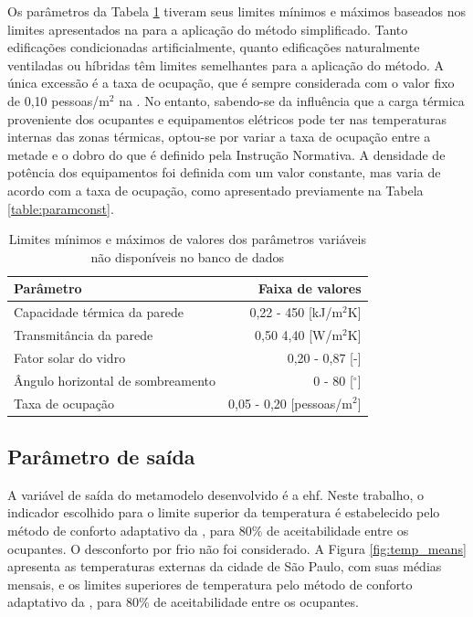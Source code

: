 \documentclass[brazil,hardcopy,openany]{ufscthesis} %
\begin{document}
Os parâmetros da Tabela \ref{table:paraminic} tiveram seus limites mínimos e máximos baseados nos limites apresentados na  para a aplicação do método simplificado. Tanto edificações condicionadas artificialmente, quanto edificações naturalmente ventiladas ou híbridas têm limites semelhantes para a aplicação do método.
A única excessão é a taxa de ocupação, que é sempre considerada com o valor fixo de 0,10 pessoas/m$^2$ na . No entanto, sabendo-se da influência que a carga térmica proveniente dos ocupantes e equipamentos elétricos pode ter nas temperaturas internas das zonas térmicas, optou-se por variar a taxa de ocupação entre a metade e o dobro do que é definido pela Instrução Normativa. A densidade de potência dos equipamentos foi definida com um valor constante, mas varia de acordo com a taxa de ocupação, como apresentado previamente na Tabela \ref{table:paramconst}.

\begin{table}[h]
	\centering
	\caption{Limites mínimos e máximos de valores dos parâmetros variáveis não disponíveis no banco de dados}
	\label{table:paraminic}
	\begin{tabular}{|l |r |}
		\hline
		\textbf{Parâmetro} & \textbf{Faixa de valores} \\
		\hline
		Capacidade térmica da parede & 0,22 - 450 [kJ/m$^2$K] \\
		\hline
		Transmitância da parede & 0,50 4,40 [W/m$^2$K] \\
		\hline
		Fator solar do vidro & 0,20 - 0,87 [-] \\
		\hline 
		Ângulo horizontal de sombreamento & 0 - 80 [$^{\circ}$] \\
		\hline 
		Taxa de ocupação & 0,05 - 0,20 [pessoas/m$^2$] \\
		\hline 
	\end{tabular}
\end{table}

\subsection{Parâmetro de saída}

A variável de saída do metamodelo desenvolvido é a \acrfull{ehf}. Neste trabalho, o indicador escolhido para o limite superior da temperatura é estabelecido pelo método de conforto adaptativo da , para 80\% de aceitabilidade entre os ocupantes. O desconforto por frio não foi considerado.
A Figura \ref{fig:temp_means} apresenta as temperaturas externas da cidade de São Paulo, com suas médias mensais, e os limites superiores de temperatura pelo método de conforto adaptativo da , para 80\% de aceitabilidade entre os ocupantes.
\end{document}
